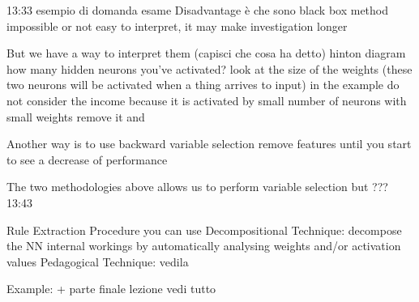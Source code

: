         13:33 esempio di domanda esame 
        Disadvantage è che sono black box method 
            impossible or not easy to interpret, it may make investigation longer 

            But we have a way to interpret them (capisci che cosa ha detto)
                hinton diagram 
                    how many hidden neurons you've activated?
                    look at the size of the weights (these two neurons will be activated when a thing arrives to input)
                    in the example do not consider the income because it is activated by small number of neurons with small weights
                    remove it and 

                Another way is to use backward variable selection 
                remove features until you start to see a decrease of performance 

                The two methodologies above allows us to perform variable selection 
                but ??? 13:43

            Rule Extraction Procedure 
                you can use 
                Decompositional Technique: decompose the NN internal workings by automatically analysing weights and/or activation values 
                Pedagogical Technique: vedila 

                Example:
                    + parte finale lezione vedi tutto 

                    

\fi


        








